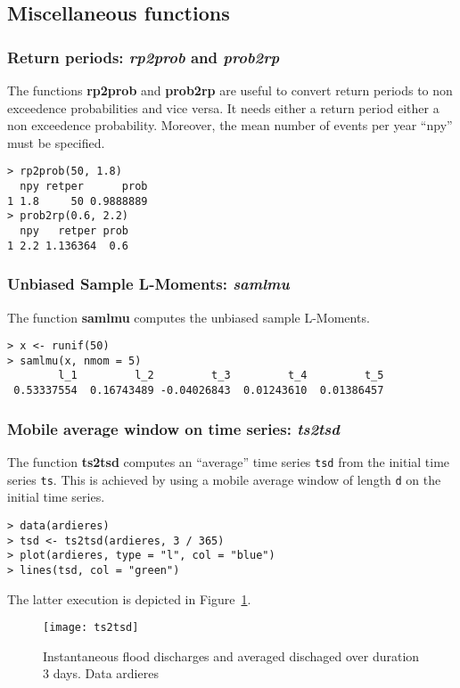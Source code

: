 \documentclass[11pt,a4paper]{article}
\numberwithin{equation}{section}
\begin{document}
\subsection{Miscellaneous functions}
\label{subsec:miscFunc}

\subsubsection{Return periods: \emph{rp2prob} and \emph{prob2rp}}

The functions \textbf{rp2prob} and \textbf{prob2rp} are useful to
convert return periods to non exceedence probabilities and vice
versa. It needs either a return period either a non exceedence
probability. Moreover, the mean number of events per year ``npy'' must
be specified.
\begin{verbatim}
> rp2prob(50, 1.8)
  npy retper      prob
1 1.8     50 0.9888889
> prob2rp(0.6, 2.2)
  npy   retper prob
1 2.2 1.136364  0.6
\end{verbatim}

\subsubsection{Unbiased Sample L-Moments: \emph{samlmu}}

The function \textbf{samlmu} computes the unbiased sample L-Moments.
\begin{verbatim}
> x <- runif(50)
> samlmu(x, nmom = 5)
        l_1         l_2         t_3         t_4         t_5 
 0.53337554  0.16743489 -0.04026843  0.01243610  0.01386457
\end{verbatim}

\subsubsection{Mobile average window on time series: \emph{ts2tsd}}

The function \textbf{ts2tsd} computes an ``average'' time series
\verb|tsd| from the initial time series \verb|ts|. This is achieved by
using a mobile average window of length \verb|d| on the initial time
series.
\begin{verbatim}
> data(ardieres)
> tsd <- ts2tsd(ardieres, 3 / 365)
> plot(ardieres, type = "l", col = "blue")
> lines(tsd, col = "green")
\end{verbatim}
The latter execution is depicted in Figure~\ref{fig:ts2tsd}.
\begin{figure}
  \centering
  \texttt{[image: ts2tsd]}
  \caption{Instantaneous flood discharges and averaged dischaged over
    duration 3 days. Data ardieres}
  \label{fig:ts2tsd}
\end{figure}
\end{document}
